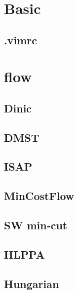 \documentclass[10pt,twocolumn,oneside]{article}
\begin{document}
\pagestyle{fancy}
\fancyfoot{}
\fancyhead[R]{\thepage}
\renewcommand{\headrulewidth}{0.4pt}
\renewcommand{\contentsname}{Contents} 

\scriptsize
\tableofcontents

\newpage

\section{Basic}
\subsection{.vimrc}


\section{flow}
\subsection{Dinic}


\subsection{DMST}


\subsection{ISAP}


\subsection{MinCostFlow}


\subsection{SW min-cut}


\subsection{HLPPA}


\subsection{Hungarian}

\end{document}

